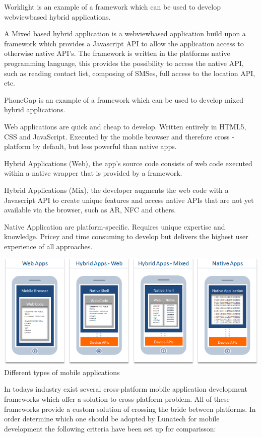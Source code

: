 Worklight is an example of a framework which can be used to develop webviewbased hybrid applications.

A Mixed based hybrid application is a webviewbased application build upon a framework which provides a Javascript API to allow the application access to otherwise native API's. The framework is written in the platforms native programming language, this provides the possibility to access the native API, such as reading contact list, composing of SMSes, full access to the location API, etc.

PhoneGap is an example of a framework which can be used to develop mixed hybrid applications.

Web applications are quick and cheap to develop. Written entirely in HTML5, CSS and JavaScript. Executed by the mobile
browser and therefore cross - platform by default, but less powerful than native apps.
 
Hybrid Applications (Web), the app's source code consists of web code executed within a native wrapper that is provided by a framework.
 
Hybrid Applications (Mix), the developer augments the web code with a Javascript API to create unique features and
access native APIs that are not yet available via the browser, such as AR, NFC and others.
 
Native Application are platform-specific. Requires unique expertise and knowledge. Pricey and time consuming to develop but
 delivers the highest user experience of all approaches.

\begin{centering}
\includegraphics[scale=0.5]{images/apptypesdefined.png}\\{Different types of mobile applications\cite{IBM-Worklight2012}}\\
\end{centering}

In todays industry exist several cross-platform mobile application development frameworks which offer a solution to cross-platform problem. All of these frameworks provide a custom solution of crossing the bride between platforms. In order determine which one should be adopted by Lunatech for mobile development the following criteria have been set up for comparisson:

